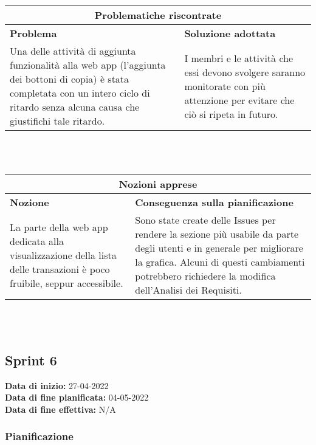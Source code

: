 \documentclass[a4paper, 12pt]{article}
\begin{document}
\begin{center}
    \begin{tabularx}{\textwidth}{|X|X|}
        \hline
        \multicolumn{2}{|c|}{\textbf{Problematiche riscontrate}}\\
        \hline
        \hline
        \textbf{Problema} & \textbf{Soluzione adottata}\\
        \hline
        Una delle attività di aggiunta funzionalità alla web app (l'aggiunta dei bottoni di copia) è stata completata con un intero ciclo di ritardo senza alcuna causa che giustifichi tale ritardo. & I membri e le attività che essi devono svolgere saranno monitorate con più attenzione per evitare che ciò si ripeta in futuro. \\
        \hline
    \end{tabularx}\\[8pt]
    \mbox{}\\
\end{center}

\begin{center}
    \begin{tabularx}{\textwidth}{|X|X|}
        \hline
        \multicolumn{2}{|c|}{\textbf{Nozioni apprese}}\\
        \hline
        \hline
        \textbf{Nozione} & \textbf{Conseguenza sulla pianificazione}\\
        \hline
        La parte della web app dedicata alla visualizzazione della lista delle transazioni è poco fruibile, seppur accessibile. & Sono state create delle Issues per rendere la sezione più usabile da parte degli utenti e in generale per migliorare la grafica. Alcuni di questi cambiamenti potrebbero richiedere la modifica dell'Analisi dei Requisiti. \\
        \hline
    \end{tabularx}\\[8pt]
    \mbox{}\\
\end{center}

\subsection{Sprint 6}
\textbf{Data di inizio:} 27-04-2022\\
\textbf{Data di fine pianificata:} 04-05-2022\\
\textbf{Data di fine effettiva:} N/A

\subsubsection{Pianificazione}\mbox{}
\end{document}
